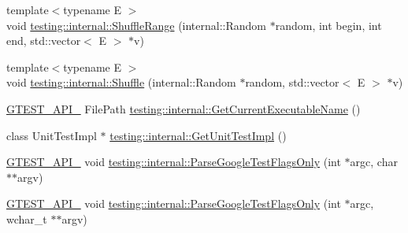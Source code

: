 \begin{DoxyCompactItemize}
{\footnotesize template$<$typename E $>$ }\\void \hyperlink{namespacetesting_1_1internal_a0e1d3dc36138a591769412d4c7779861}{testing\+::internal\+::\+Shuffle\+Range} (internal\+::\+Random $\ast$random, int begin, int end, std\+::vector$<$ E $>$ $\ast$v)
\item 
{\footnotesize template$<$typename E $>$ }\\void \hyperlink{namespacetesting_1_1internal_a90d9e6ffe8522a7eb1b2ce9b1a0c4673}{testing\+::internal\+::\+Shuffle} (internal\+::\+Random $\ast$random, std\+::vector$<$ E $>$ $\ast$v)
\item 
\hyperlink{gtest-port_8h_aa73be6f0ba4a7456180a94904ce17790}{G\+T\+E\+S\+T\+\_\+\+A\+P\+I\+\_\+} File\+Path \hyperlink{namespacetesting_1_1internal_a7a2bbf069f75bc99873976ad6fc356ad}{testing\+::internal\+::\+Get\+Current\+Executable\+Name} ()
\item 
class Unit\+Test\+Impl $\ast$ \hyperlink{namespacetesting_1_1internal_a9bd0caf5d16512de38b39599c13ee634}{testing\+::internal\+::\+Get\+Unit\+Test\+Impl} ()
\item 
\hyperlink{gtest-port_8h_aa73be6f0ba4a7456180a94904ce17790}{G\+T\+E\+S\+T\+\_\+\+A\+P\+I\+\_\+} void \hyperlink{namespacetesting_1_1internal_a472880afbcc592a41e3d623e2dec8412}{testing\+::internal\+::\+Parse\+Google\+Test\+Flags\+Only} (int $\ast$argc, char $\ast$$\ast$argv)
\item 
\hyperlink{gtest-port_8h_aa73be6f0ba4a7456180a94904ce17790}{G\+T\+E\+S\+T\+\_\+\+A\+P\+I\+\_\+} void \hyperlink{namespacetesting_1_1internal_aa3c81a67914856448d0778990d9d9cab}{testing\+::internal\+::\+Parse\+Google\+Test\+Flags\+Only} (int $\ast$argc, wchar\+\_\+t $\ast$$\ast$argv)
\end{DoxyCompactItemize}
